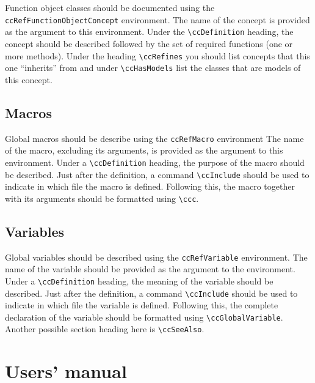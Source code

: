 Function object classes should be documented using the
{\tt ccRefFunctionObjectConcept} environment.
The name of the concept is provided as the argument to this environment.
Under the \verb|\ccDefinition| heading, the concept should be described
followed by the set of required functions (one or more
 methods).  Under the heading \verb|\ccRefines| 
you should list concepts that this one ``inherits'' from and
under \verb|\ccHasModels| list the classes that are models of this
concept.

\subsection{Macros}
\label{sec:ref_macro}

Global macros should be describe using the {\tt ccRefMacro} environment%
The name of the macro, excluding its arguments, is provided as the argument
to this environment.  Under a \verb|\ccDefinition| heading, the purpose of
the macro should be described.  Just after the definition, a command 
\verb|\ccInclude| should be used to indicate in which file the macro is 
defined.  Following this, the macro together with its arguments should 
be formatted using \verb|\ccc|.  

\subsection{Variables}
\label{sec:ref_variable}

Global variables should be described using the 
{\tt ccRefVariable} environment.%
The name of the variable
should be provided as the argument to the environment.  Under a
\verb|\ccDefinition| heading, the meaning of the variable
should be described.  Just after the definition, a command 
\verb|\ccInclude| should be used to indicate in which file the variable
is defined.  Following this, the complete declaration of the variable
should be formatted using \verb|\ccGlobalVariable|.
Another possible section heading here is \verb|\ccSeeAlso|.

\section{Users' manual}
\label{sec:users_manual}

